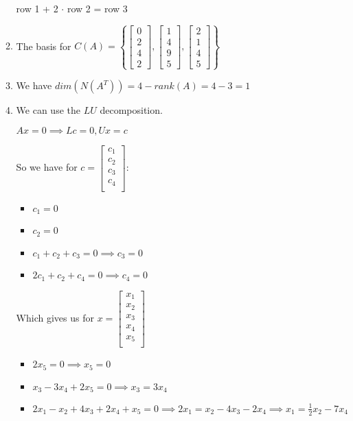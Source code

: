 \documentclass[12pt,letterpaper]{article}
\begin{document}
\begin{enumerate}
\begin{enumerate}
          row 1 + 2 $\cdot$ row 2 = row 3
        \item
          The basis for
          $C(A) = \left\{\begin{bmatrix}0 \\ 2 \\ 4 \\ 2\end{bmatrix}, \begin{bmatrix}1 \\ 4 \\ 9 \\ 5\end{bmatrix}, \begin{bmatrix}2 \\ 1 \\ 4 \\ 5\end{bmatrix}\right\}$
        \item We have $dim(N(A^T)) = 4 - rank(A) = 4 - 3 = 1$
        \item
          We can use the $LU$ decomposition.

          $Ax = 0 \implies Lc = 0, Ux = c$

          So we have for $c = \begin{bmatrix}c_1 \\ c_2 \\ c_3 \\ c_4 \\\end{bmatrix}$:
          \begin{itemize}
            \item $c_1 = 0$
            \item $c_2 = 0$
            \item $c_1 + c_2 + c_3 = 0 \implies c_3 = 0$
            \item $2c_1 + c_2 + c_4 = 0 \implies c_4 = 0$
          \end{itemize}

          Which gives us for $x = \begin{bmatrix}x_1 \\ x_2 \\ x_3 \\ x_4 \\ x_5 \\\end{bmatrix}$
          \begin{itemize}
            \item $2x_5 = 0 \implies x_5 = 0$
            \item $x_3 - 3 x_4 + 2 x_5 = 0 \implies x_3 = 3 x_4$
            \item $2 x_1 - x_2 + 4 x_3 + 2 x_4 + x_5 = 0 \implies 2 x_1 = x_2 - 4 x_3 - 2 x_4 \implies x_1 = \frac{1}{2}x_2 - 7 x_4$
          \end{itemize}


\end{enumerate}
\end{enumerate}
\end{document}
